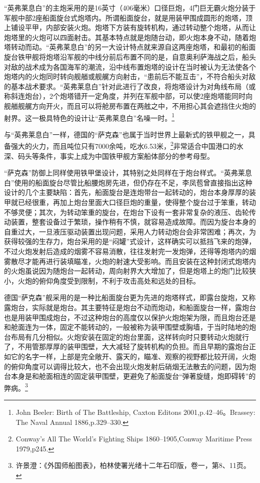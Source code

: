 \documentclass[12pt,UTF8]{ctexbook}
\begin{document}
“英弗莱息白”的主炮采用的是16英寸（406毫米）口径巨炮，4门巨无霸火炮分装于军舰中部2座船面旋台式炮塔内。所谓船面旋台，就是用装甲围成圆形的炮塔，顶上铺设平甲，内部安装火炮。炮塔下方装有旋转机构，通过转动整个炮塔，从而让炮塔里的火炮可以四面射击。其基本特点就是炮随台动，即火炮本身不动，随着炮塔转动而动。“英弗莱息白”的另一大设计特点就来源自这两座炮塔，和最初的船面旋台铁甲舰将炮塔沿军舰的中线分前后布置不同的是，自意奥利萨海战之后，船头对敌的战术成为各国海军的潮流，沿中线布置炮塔的设计在当时被认为无法使各个炮塔内的火炮同时转向舰艏或舰艉方向射击，“患前后不能互击”，不符合船头对敌的基本战术要求。“英弗莱息白”针对此进行了改良，将炮塔设计为对角线布局（或称斜连炮台），2个炮塔错开一定角度，并列在军舰中部，可以使2座炮塔能同时向舰艏舰艉方向开火，而且可以将舱房布置在两舷之中，不用担心其会遮挡住火炮的射界。这一极具特色的设计让“英弗莱息白”名噪一时。\footnote{John Beeler: Birth of The Battleship, Caxton Editons 2001,p.42--46。Brassey: The Naval Annual 1886,p.329--330.}

与“英弗莱息白”一样，德国的“萨克森”也属于当时世界上最新式的铁甲舰之一，具备强大的火力，而且吨位只有7000余吨，吃水6.53米，\footnote{Conway's All The World's Fighting Ships 1860--1905,Conway Maritime Press 1979,p245.}非常适合中国港口的水深、码头等条件，事实上成为中国铁甲舰方案船体部分的参考母型。

“萨克森”防御上同样使用铁甲堡设计，其特别之处同样在于炮台样式。“英弗莱息白”使用的船面旋台尽管比船腰炮房先进，但仍存在不足，李凤苞曾直接指出这种设计的几个主要缺陷：首先，船面旋台是连炮带台一起转动的，炮台本身厚厚的装甲就已经很重，再加上炮台里面大口径巨炮的重量，使得整个旋台过于笨重，转动不够灵便；其次，为转动笨重的旋台，在炮台下设有一套非常复杂的液压、齿轮传动装置，整套设备过于繁琐，操作稍有不慎，就容易造成故障。而因为旋台本身的自重过大，一旦液压驱动装置出现问题，采用人力转动炮台会非常困难；再次，为获得较强的生存力，炮台采用的是“闷罐”式设计，这样确实可以抵挡飞来的炮弹，不过火炮发射后造成的烟雾不容易消散，往往发射完一发炮弹，还得等炮塔内的烟雾散尽才能再进行装填瞄准，火炮的射速大受影响。而且安装在这种封闭式炮塔内的火炮虽说因为随炮台一起转动，周向射界大大增加了，但是炮塔上的炮门比较狭小，火炮的俯仰角度受到限制，不利于攻击高处和远处的目标。

德国“萨克森”舰采用的是一种比船面旋台更为先进的炮塔样式，即露台旋炮，又称露炮台，实际就是炮台。其主要特征是炮台不动而炮动，和船面旋台一样，露炮台也是用装甲围成炮台，不过这种炮台的高度仅以保护火炮炮架为限，而且炮台还是和舱面连为一体，固定不能转动的，一般被称为装甲围壁或胸墙，于当时陆地的炮台布局有几分相似。火炮安装在固定的炮台里面，这样转向时只要转动火炮就行了，不用管那厚厚的装甲围壁，大大减轻了旋转机构的负担。而且早期的露炮台正如它的名字一样，上部是完全敞开、露天的，瞄准、观察的视野都比较开阔，火炮的俯仰角度可以调得比较大，也不会出现火炮发射后硝烟无法散去的问题，因为炮台本身是和舱面相连的固定装甲围壁，更避免了船面旋台“弹著旋缝，炮即碍转”的弊病。\footnote{许景澄：《外国师船图表》，柏林使署光绪十二年石印版，卷一，第8、11页。}
\end{document}
